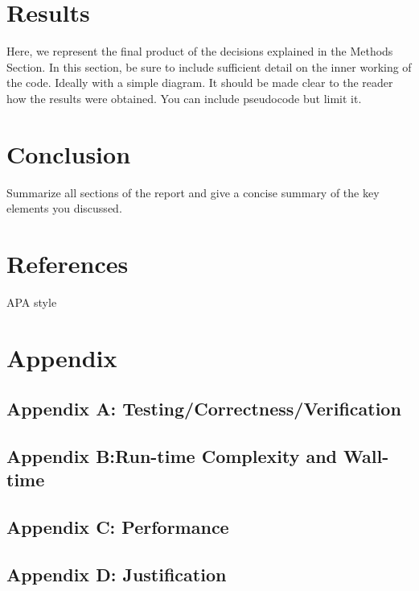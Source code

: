 \documentclass{article}
\begin{document}
\section{Results}
Here, we represent the final product of the decisions explained in the Methods Section. In this section, be sure to include sufficient detail on the inner working of the code. Ideally with a simple diagram. It should be made clear to the reader how the results were obtained. You can include pseudocode but limit it.

\section{Conclusion}
Summarize all sections of the report and give a concise summary of the key elements you discussed.


\section{References}
APA style


\section{Appendix}
\subsection{Appendix A: Testing/Correctness/Verification}
\subsection{Appendix B:Run-time Complexity and Wall-time}
\subsection{Appendix C: Performance}
\subsection{Appendix D: Justification}
\end{document}
